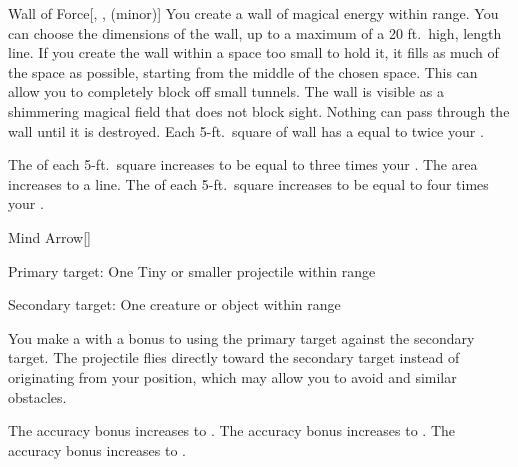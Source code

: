 \lowercase{\hypertarget{spell:Wall of Force}{}}\label{spell:Wall of Force}
\begin{freeability}[Rank 1]{\hypertarget{spell:Wall of Force}{Wall of Force}}[, ,  (minor)]
\targetrule
You create a wall of magical energy within \rngmed range.
You can choose the dimensions of the wall, up to a maximum of a 20 ft.\ high, \areamed length line.
If you create the wall within a space too small to hold it, it fills as much of the space as possible, starting from the middle of the chosen space.
This can allow you to completely block off small tunnels.
The wall is visible as a shimmering magical field that does not block sight.
Nothing can pass through the wall until it is destroyed.
Each 5-ft.\ square of wall has a  equal to twice your .

\rankline
{} The  of each 5-ft.\ square increases to be equal to three times your .
 The area increases to a \arealarge line.
 The  of each 5-ft.\ square increases to be equal to four times your .
\end{freeability}
\vspace{0.25em}



\lowercase{\hypertarget{spell:Mind Arrow}{}}\label{spell:Mind Arrow}
\begin{freeability}[Rank 2]{\hypertarget{spell:Mind Arrow}{Mind Arrow}}[]

Primary target: One Tiny or smaller  projectile within \rngmed range
\par\noindent
Secondary target: One creature or object within \rngmed range

You make a  with a  bonus to  using the primary target against the secondary target.
The projectile flies directly toward the secondary target instead of originating from your position, which may allow you to avoid  and similar obstacles.

\rankline
{} The accuracy bonus increases to .
 The accuracy bonus increases to .
 The accuracy bonus increases to .
\end{freeability}
\vspace{0.25em}



